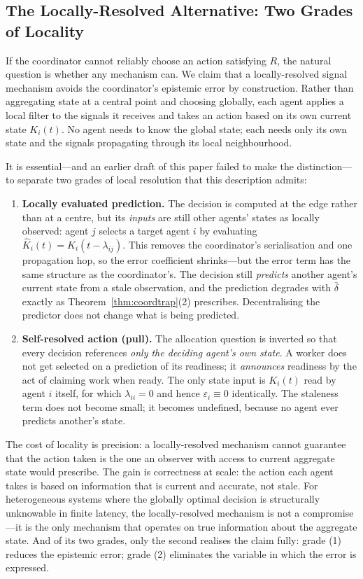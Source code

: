 \documentclass[11pt]{article}
\theoremstyle{definition}
\theoremstyle{plain}
\theoremstyle{plain}
\begin{document}
\subsection{The Locally-Resolved Alternative: Two Grades of Locality}
\label{sec:twogrades}

If the coordinator cannot reliably choose an action satisfying $R$, the natural
question is whether any mechanism can. We claim that a locally-resolved signal
mechanism avoids the coordinator's epistemic error by construction. Rather than
aggregating state at a central point and choosing globally, each agent
applies a local filter to the signals it receives and takes an action based on
its own current state $K_i(t)$. No agent needs to know the global state; each
needs only its own state and the signals propagating through its local
neighbourhood.

It is essential---and an earlier draft of this paper failed to make the
distinction---to separate two grades of local resolution that this
description admits:

\begin{enumerate}
\item \textbf{Locally evaluated prediction.} The decision is computed at the
  edge rather than at a centre, but its \emph{inputs} are still other
  agents' states as locally observed: agent $j$ selects a target agent $i$
  by evaluating $\hat{K}_i(t) = K_i(t - \lambda_{ij})$. This removes the
  coordinator's serialisation and one propagation hop, so the error
  coefficient shrinks---but the error term has the same structure as the
  coordinator's. The decision still \emph{predicts} another agent's current
  state from a stale observation, and the prediction degrades with
  $\bar{\delta}$ exactly as Theorem~\ref{thm:coordtrap}(2) prescribes.
  Decentralising the predictor does not change what is being predicted.
\item \textbf{Self-resolved action (pull).} The allocation question is
  inverted so that every decision references \emph{only the deciding agent's
  own state}. A worker does not get selected on a prediction of its
  readiness; it \emph{announces} readiness by the act of claiming work when
  ready. The only state input is $K_i(t)$ read by agent $i$ itself, for
  which $\lambda_{ii} = 0$ and hence $\varepsilon_i \equiv 0$ identically.
  The staleness term does not become small; it becomes undefined, because
  no agent ever predicts another's state.
\end{enumerate}

The cost of locality is precision: a locally-resolved mechanism cannot
guarantee that the action taken is the one an observer with access to current
aggregate state would prescribe. The gain is correctness
at scale: the action each agent takes is based on information that is current
and accurate, not stale. For heterogeneous systems where the globally optimal
decision is structurally unknowable in finite latency, the locally-resolved
mechanism is not a compromise---it is the only mechanism that operates on true
information about the aggregate state. And of its two grades, only the second
realises the claim fully: grade (1) reduces the epistemic error; grade (2)
eliminates the variable in which the error is expressed.
\end{document}
